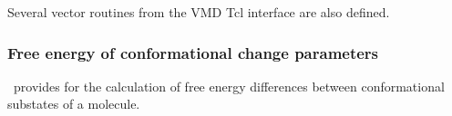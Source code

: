 Several vector routines from the VMD Tcl interface are also defined.

\subsubsection{Free energy of conformational change parameters}

\NAMD\ provides for the calculation of free energy differences between conformational substates of a molecule.

